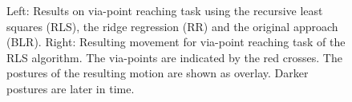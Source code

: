 \begin{figure}
    \centering
    \begin{minipage}{0.45\textwidth}
      \centering
      
      \hspace{1cm}                       
    \end{minipage}\hfill
    \begin{minipage}{0.45\textwidth}
      \centering
      
      \hspace{1cm}                       
    \end{minipage}
     \caption{\small
       {\color{gray!25!black!60} Left:}
       Results on via-point reaching task
       using the recursive least squares (RLS),
       the ridge regression (RR)
       and the original approach
       (BLR).
       {\color{gray!25!black!60} Right:} Resulting movement for
       via-point reaching task of the RLS algorithm.
       The via-points are indicated by the red crosses. The
       postures of the resulting motion are shown as overlay.
       Darker postures are later in time.
     }
     \label{fig:reaching_result}      
\end{figure}




